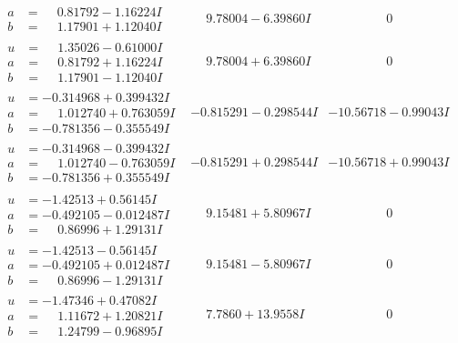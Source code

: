 \documentclass[1p]{elsarticle_modified}
\theoremstyle{definition}
\begin{document}
$$\begin{array}{c|c|c}
\begin{aligned}
a &= \phantom{-}0.81792 - 1.16224 I \\
b &= \phantom{-}1.17901 + 1.12040 I\end{aligned}
 & \phantom{-}9.78004 - 6.39860 I & \phantom{-0.000000 } 0 \\ \hline\begin{aligned}
u &= \phantom{-}1.35026 - 0.61000 I \\
a &= \phantom{-}0.81792 + 1.16224 I \\
b &= \phantom{-}1.17901 - 1.12040 I\end{aligned}
 & \phantom{-}9.78004 + 6.39860 I & \phantom{-0.000000 } 0 \\ \hline\begin{aligned}
u &= -0.314968 + 0.399432 I \\
a &= \phantom{-}1.012740 + 0.763059 I \\
b &= -0.781356 - 0.355549 I\end{aligned}
 & -0.815291 - 0.298544 I & -10.56718 - 0.99043 I \\ \hline\begin{aligned}
u &= -0.314968 - 0.399432 I \\
a &= \phantom{-}1.012740 - 0.763059 I \\
b &= -0.781356 + 0.355549 I\end{aligned}
 & -0.815291 + 0.298544 I & -10.56718 + 0.99043 I \\ \hline\begin{aligned}
u &= -1.42513 + 0.56145 I \\
a &= -0.492105 - 0.012487 I \\
b &= \phantom{-}0.86996 + 1.29131 I\end{aligned}
 & \phantom{-}9.15481 + 5.80967 I & \phantom{-0.000000 } 0 \\ \hline\begin{aligned}
u &= -1.42513 - 0.56145 I \\
a &= -0.492105 + 0.012487 I \\
b &= \phantom{-}0.86996 - 1.29131 I\end{aligned}
 & \phantom{-}9.15481 - 5.80967 I & \phantom{-0.000000 } 0 \\ \hline\begin{aligned}
u &= -1.47346 + 0.47082 I \\
a &= \phantom{-}1.11672 + 1.20821 I \\
b &= \phantom{-}1.24799 - 0.96895 I\end{aligned}
 & \phantom{-}7.7860 + 13.9558 I & \phantom{-0.000000 } 0 \\ \hline\begin{aligned}

\end{aligned}
\end{array}$$
\end{document}
